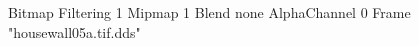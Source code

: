 {Bitmap
	{Filtering 1}
	{Mipmap 1}
	{Blend none}
	{AlphaChannel 0}
	{Frame "housewall05a.tif.dds"}
}
